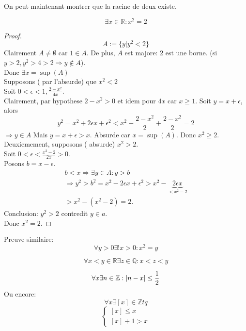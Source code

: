 \documentclass[../main.tex]{subfiles}
\begin{document}
On peut maintenant montrer que la racine de deux existe.
\begin{thm}\label{thm:la_racine_de_deux_existe}
	\[ 
	\exists x \in \mathbb{R}: x^{2}=2
	\]
	
\end{thm}
\begin{proof}
\[ 
	A := \{ y \vert y^{2} < 2 \}
\]
Clairement $A \neq \emptyset$ car $1 \in A$. De plus, $A$ est majore:
$2$ est une borne. (si $y>2, y^{2}>4>2 \Rightarrow y \notin A$).\\
Donc $\exists x = \sup ( A)$\\
Supposons ( par l'absurde) que $x^{2}<2$ \\
Soit $0 < \epsilon < 1, \frac{2-x^{2}}{4x}$.\\
Clairement, par hypothese $2-x^{2} > 0$ et idem pour $4x$ car $x \geq 1$.
Soit $y=x+\epsilon$, alors
\[ 
y^{2} = x^{2} + 2\epsilon x + \epsilon^{2} < x^{2} + \frac{2-x^{2}}{2} + \frac{2-x^{2}}{2} = 2
\]
$\Rightarrow y \in A$  Mais $y= x + \epsilon > x$.
Absurde car $x= \sup ( A)$.
Donc $x^{2}\geq 2$.
Deuxiemement, supposons ( absurde) $x^{2}>2$.\\
Soit $0 < \epsilon < \frac{x^{2}-2}{2x}>0$.\\
Posons $b= x - \epsilon$.
\begin{align*}
b < x \Rightarrow \exists y \in A: y>b\\
\Rightarrow y^{2} > b^{2} = x^{2}-2 \epsilon x + \epsilon ^{2} > x^{2} - \underbrace{ 2\epsilon x }_{< x^{2} -2}\\
> x^{2} - ( x^{2}-2) = 2.
\end{align*}
Conclusion: $y^{2}>2$ contredit $y \in a$.\\
Donc $x^{2}=2$.
\end{proof}
\begin{rmq}
Preuve similaire:\\
 \[ 
\forall y > 0 \exists ! x>0: x^{2}=y
\]

\end{rmq}
\begin{propo}\label{propo:_mathbb_q_est_dense_dans_mathbb_r_}
	\[ 
	\forall x < y \in \mathbb{R} \exists z \in \mathbb{Q}: x <z<y
	\]
	
\end{propo}
\begin{lemma}
\[ 
	\forall x \exists n \in \mathbb{Z}: \left\vert n-x\right\vert \leq \frac{1}{2}
\]
Ou encore:
\[ 
\forall x \exists [ x] \in \mathbb{Z} tq
\]
\[ 
\begin{cases}
[ x] \leq x\\
[ x] +1 > x
\end{cases}
\]
\end{lemma}
\end{document}

